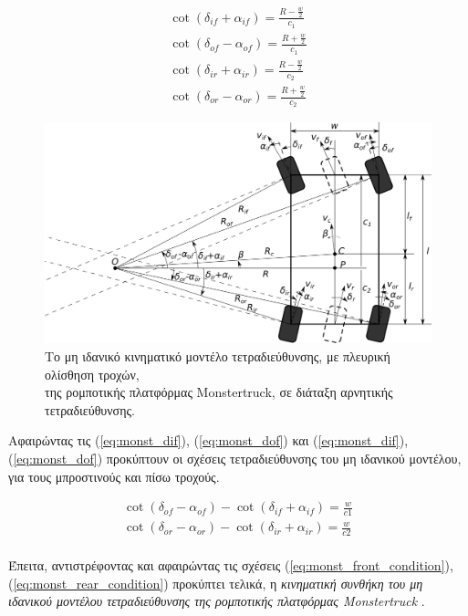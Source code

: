 \begin{align}
	\cot(\delta_{if} + \alpha_{if}) = \frac{R - \frac{w}{2}}{c_1}
	\label{eq:monst_dif}\\
	\cot(\delta_{of} - \alpha_{of}) = \frac{R + \frac{w}{2}}{c_1}
	\label{eq:monst_dof}\\
	\cot(\delta_{ir} + \alpha_{ir}) = \frac{R - \frac{w}{2}}{c_2} 
	\label{eq:monst_dir}\\
	\cot(\delta_{or} - \alpha_{or}) = \frac{R + \frac{w}{2}}{c_2}
	\label{eq:monst_dor}
\end{align}


\begin{figure}[!ht]
	\centering
	\includegraphics[width=0.7\linewidth]{Chapters/Chapter2/Figures/monstertruck_slip_angle_model_parallel.png}
	\caption{Το μη ιδανικό κινηματικό μοντέλο τετραδιεύθυνσης, με πλευρική ολίσθηση τροχών,\\ της ρομποτικής πλατφόρμας Monstertruck, σε διάταξη αρνητικής τετραδιεύθυνσης.}
	\label{fig:monstertruck_slip_angle_model}
\end{figure}

\bigskip
Αφαιρώντας τις (\ref{eq:monst_dif}), (\ref{eq:monst_dof}) και (\ref{eq:monst_dif}), (\ref{eq:monst_dof}) προκύπτουν οι σχέσεις τετραδιεύθυνσης του μη ιδανικού μοντέλου, για τους μπροστινούς και πίσω τροχούς.

\begin{align}
	\cot(\delta_{of} - \alpha_{of}) - \cot(\delta_{if} + \alpha_{if}) = \frac{w}{c1}
	\label{eq:monst_front_condition}\\
	\cot(\delta_{or} - \alpha_{or}) - \cot(\delta_{ir} + \alpha_{ir}) = \frac{w}{c2}
	\label{eq:monst_rear_condition}\\
\end{align}

\bigskip
Έπειτα, αντιστρέφοντας και αφαιρώντας τις σχέσεις (\ref{eq:monst_front_condition}), (\ref{eq:monst_rear_condition}) προκύπτει τελικά, η \textit{κινηματική συνθήκη του μη ιδανικού μοντέλου τετραδιεύθυνσης της ρομποτικής πλατφόρμας Monstertruck} \cite{4ws_kinematics}. 


